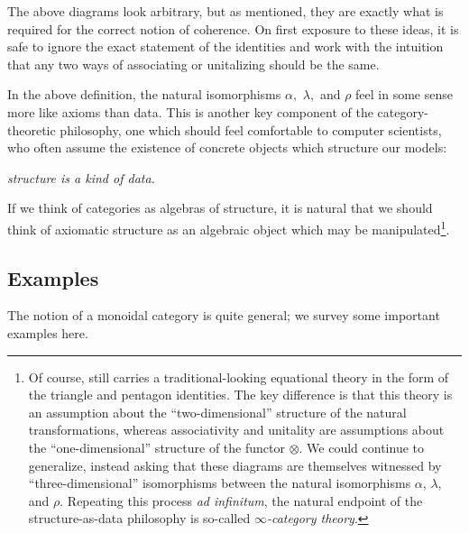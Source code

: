 The above diagrams look arbitrary, but as mentioned, they are exactly what is
required for the correct notion of coherence. On first exposure to these ideas,
it is safe to ignore the exact statement of the identities and work with the
intuition that any two ways of associating or unitalizing should be the same.

In the above definition, the natural isomorphisms $\alpha,$ $\lambda,$ and
$\rho$ feel in some sense more like axioms than data. This is another key
component of the category-theoretic philosophy, one which should feel
comfortable to computer scientists, who often assume the existence of concrete
objects which structure our models:\begin{center}
  \emph{
    structure is a kind of data.
  }
\end{center}
If we think of categories as algebras of structure, it is natural that we should
think of axiomatic structure as an algebraic object which may be
manipulated\footnote{
  Of course, 
  still carries a traditional-looking equational theory in the form of the
  triangle and pentagon identities. The key difference is that this theory is an
  assumption about the ``two-dimensional'' structure of the natural
  transformations, whereas associativity and unitality are assumptions about the
  ``one-dimensional'' structure of the functor $\otimes$. We could continue to
  generalize, instead asking that these diagrams are themselves witnessed by
  ``three-dimensional'' isomorphisms between the natural isomorphisms $\alpha$,
  $\lambda$, and $\rho$. Repeating this process \emph{ad infinitum}, the natural
  endpoint of the structure-as-data philosophy is so-called
  \emph{$\infty$-category theory}.
}.

\subsection{Examples}
\label{sec:monoidal examples}

The notion of a monoidal category is quite general; we survey some important
examples here.

